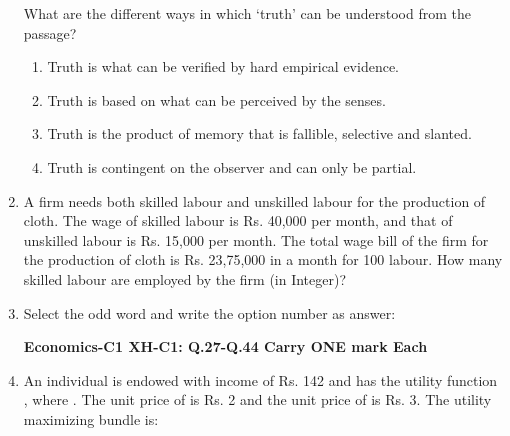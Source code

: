 \documentclass[12pt]{article}
\theoremstyle{remark}
\begin{document}
\begin{enumerate}
\newline
What are the different ways in which ‘truth’ can be understood from the passage?\\
\begin{enumerate} 
\item  Truth is what can be verified by hard empirical evidence. 
\item Truth is based on what can be perceived by the senses. 
\item Truth is the product of memory that is fallible, selective and slanted. 
\item Truth is contingent on the observer and can only be partial. 
\end{enumerate}
\hfill{}
\item  A firm needs both skilled labour and unskilled labour for the production of cloth. The wage of skilled labour is Rs. 40,000 per month, and that of unskilled labour is Rs. 15,000 per month. The total wage bill of the firm for the production of cloth is Rs. 23,75,000 in a month for 100 labour. How many skilled labour are employed by the firm (in Integer)? 
\hfill{}
\item  Select the odd word and write the option number as answer:
\begin{enumerate}  \end{enumerate}
\hfill{}
\newpage
\textbf{Economics-C1 \newline XH-C1:  Q.27-Q.44 Carry ONE mark Each}
\item An individual is endowed with income of Rs. 142 and has the utility function 
, where . The unit price of  is Rs. 2 and the unit price of  is Rs. 3. The utility maximizing bundle is:
\begin{enumerate} 
\end{enumerate}
\end{enumerate}
\end{document}
